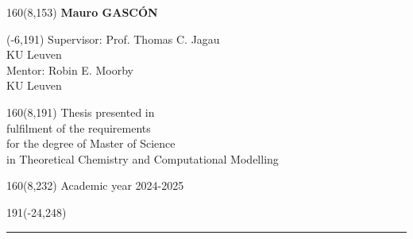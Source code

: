 \documentclass[12pt,a4paper,oneside]{book}
\begin{document}
%
\begin{textblock}{160}(8,153)
\textblockcolour{}
\vspace{-\parskip}
\flushright
\fontsize{14}{16}\selectfont \textbf{Mauro GASC{\'O}N}
\end{textblock}
%
\begin{textblock}{70}(-6,191)
\textblockcolour{}
\vspace{-\parskip}
\flushleft
Supervisor: Prof. Thomas C. Jagau\\[-2pt]
\textcolor{blueaff}{KU Leuven}\\[5pt]
Mentor: Robin E. Moorby\\[-2pt]
\textcolor{blueaff}{KU Leuven}\\
\end{textblock}
%
\begin{textblock}{160}(8,191)
\textblockcolour{}
\vspace{-\parskip}
\flushright
Thesis presented in\\[4.5pt]
fulfilment of the requirements\\[4.5pt]
for the degree of Master of Science\\[4.5pt]
in Theoretical Chemistry and Computational Modelling\\
\end{textblock}
%
\begin{textblock}{160}(8,232)
\textblockcolour{}
\vspace{-\parskip}
\flushright
Academic year 2024-2025
\end{textblock}
%
\begin{textblock}{191}(-24,248)
{\color{blueline}\rule{550pt}{5.5pt}}
\end{textblock}
%

\setcounter{page}{0}
\onehalfspacing


\rmfamily




\sffamily
\tableofcontents
\rmfamily

\newpage
\setcounter{page}{0}
\end{document}
